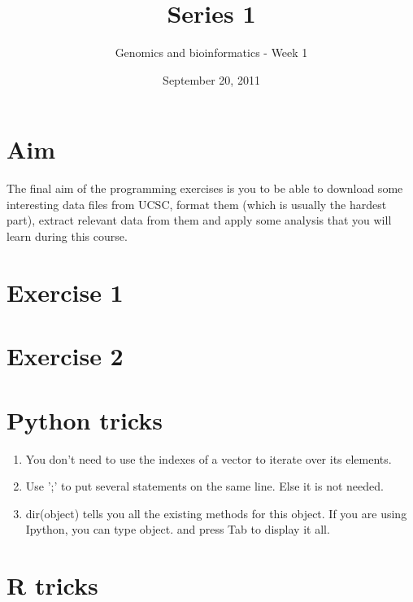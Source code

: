 \documentclass[a4paper,11pt]{article}
\title{Series 1}
\date{September 20, 2011}
\author{Genomics and bioinformatics - Week 1}
\begin{document}
\maketitle


\section{Aim}
The final aim of the programming exercises is you to be able to
download some interesting data files from UCSC, format them
(which is usually the hardest part), extract relevant data from them
and apply some analysis that you will learn during this course.

\section{Exercise 1}

\section{Exercise 2}

\newpage

\section{Python tricks}
\begin{enumerate}
\item You don't need to use the indexes of a vector to iterate over its elements.
\item Use ';' to put several statements on the same line. Else it is not needed.
\item dir(object) tells you all the existing methods for this object. If you are using
Ipython, you can type object. and press Tab to display it all.
\end{enumerate}

\section{R tricks}
\end{document}
